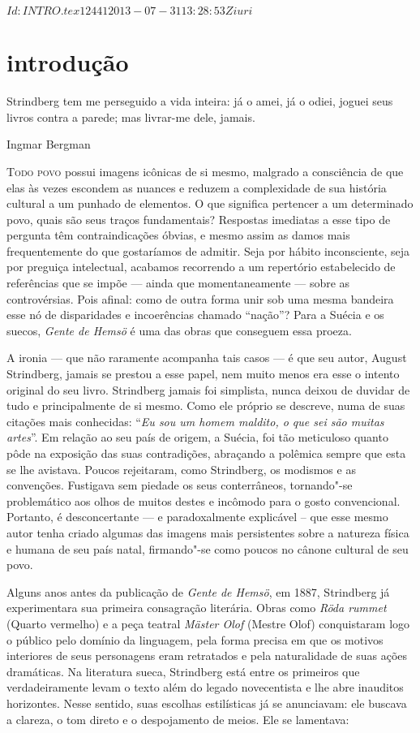 \SVN $Id: INTRO.tex 12441 2013-07-31 13:28:53Z iuri $
\chapter[Introdução, por Leon Rabelo]{introdução}

\epigraph{Strindberg tem me perseguido a vida inteira: já o amei, já o odiei, 
joguei seus livros contra a parede; mas livrar-me dele, jamais.}{Ingmar Bergman}


\noindent\textsc{Todo povo} possui imagens icônicas de si mesmo, 
malgrado a consciência de que elas às vezes escondem as nuances e 
reduzem a complexidade de sua história cultural a um punhado de elementos. 
O que significa pertencer a um determinado povo, quais são seus traços fundamentais? 
Respostas imediatas a esse tipo de pergunta têm contraindicações óbvias, e
mesmo assim as damos mais frequentemente do que gostaríamos de admitir.
Seja por hábito inconsciente, seja por preguiça intelectual, acabamos
recorrendo a um repertório estabelecido de referências que se impõe --- ainda que
momentaneamente --- sobre as controvérsias.  Pois afinal: como de outra
forma unir sob uma mesma bandeira esse nó de disparidades e
incoerências chamado “nação”?  Para a Suécia e os suecos, 
\textit{Gente de Hemsö} é uma das obras que conseguem essa proeza. 

A ironia --- que não raramente acompanha tais casos --- é que seu autor,
August Strindberg, jamais se prestou a esse papel, nem muito menos era
esse o intento original do seu livro. Strindberg jamais foi simplista,
nunca deixou de duvidar de tudo e principalmente de si mesmo. Como ele
próprio se descreve, numa de suas citações mais conhecidas: ``\textit{Eu
sou um homem maldito, o que sei são muitas artes}''. Em relação ao seu
país de origem, a Suécia, foi tão meticuloso quanto pôde na exposição
das suas contradições, abraçando a polêmica sempre que esta se lhe
avistava. Poucos rejeitaram, como Strindberg, os modismos e as
convenções. Fustigava sem piedade os seus conterrâneos, tornando"-se
problemático aos olhos de muitos destes e incômodo para o gosto
convencional. Portanto, é desconcertante --- e paradoxalmente explicável
– que esse mesmo autor tenha criado algumas das imagens mais
persistentes sobre a natureza física e humana de seu país natal, 
firmando"-se como poucos no cânone cultural de seu povo. 

Alguns anos antes da publicação de \textit{Gente de Hemsö}, em 1887, Strindberg já experimentara
sua primeira consagração literária. Obras como
\textit{Röda rummet} (Quarto vermelho) e a peça teatral \textit{Mäster Olof} (Mestre Olof) 
conquistaram logo o público pelo domínio da linguagem, pela forma
precisa em que os motivos interiores de seus personagens eram
retratados e pela naturalidade de suas ações dramáticas. Na
literatura sueca, Strindberg está entre os primeiros que
verdadeiramente levam o texto além do legado novecentista
e lhe abre inauditos horizontes. Nesse sentido, suas
escolhas estilísticas já se anunciavam: ele buscava a clareza, o tom
direto e o despojamento de meios. Ele se lamentava: 

